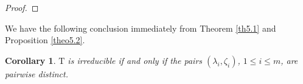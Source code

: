 \documentclass[12pt,reqno]{amsart}
\numberwithin{equation}{section}
\newtheorem{coro}[theo]{Corollary}
\begin{document}
\begin{proof}



\end{proof}

We have the following conclusion immediately from Theorem \ref{th5.1} and Proposition \ref{theo5.2}.

\begin{coro}\label{coro6.6}
  $\mathrm{T}$ is irreducible if and only if the pairs $(\lambda_i,\zeta_i)$, $1\le i \le m$, are pairwise distinct.
\end{coro}


\end{document}
